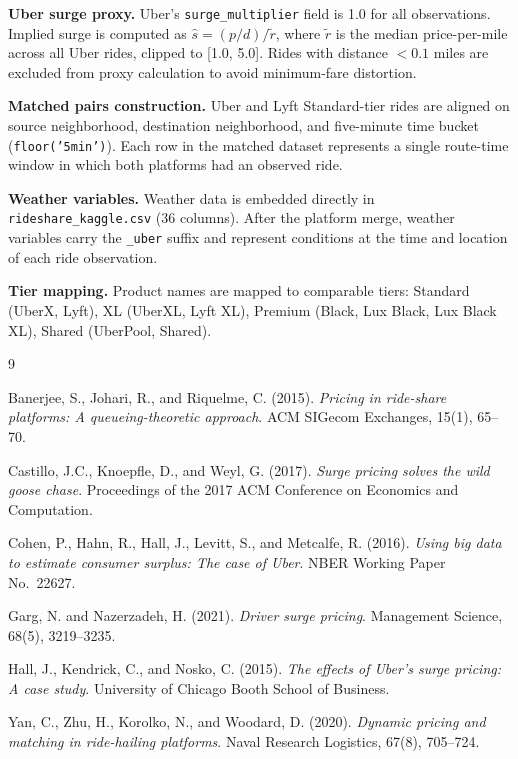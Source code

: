 \documentclass[11pt, letterpaper]{article}
\begin{document}
\textbf{Uber surge proxy.} Uber's \texttt{surge\_multiplier} field is
1.0 for all observations. Implied surge is computed as
$\hat{s} = (p/d) / \tilde{r}$, where $\tilde{r}$ is the median
price-per-mile across all Uber rides, clipped to [1.0, 5.0].
Rides with distance $< 0.1$ miles are excluded from proxy calculation
to avoid minimum-fare distortion.

\textbf{Matched pairs construction.} Uber and Lyft Standard-tier rides
are aligned on source neighborhood, destination neighborhood, and
five-minute time bucket (\texttt{floor('5min')}). Each row in the
matched dataset represents a single route-time window in which both
platforms had an observed ride.

\textbf{Weather variables.} Weather data is embedded directly in
\texttt{rideshare\_kaggle.csv} (36 columns). After the platform merge,
weather variables carry the \texttt{\_uber} suffix and represent
conditions at the time and location of each ride observation.

\textbf{Tier mapping.} Product names are mapped to comparable tiers:
Standard (UberX, Lyft), XL (UberXL, Lyft XL), Premium (Black, Lux Black,
Lux Black XL), Shared (UberPool, Shared).

\newpage

\begin{thebibliography}{9}

Banerjee, S., Johari, R., and Riquelme, C. (2015).
\textit{Pricing in ride-share platforms: A queueing-theoretic approach}.
ACM SIGecom Exchanges, 15(1), 65--70.

Castillo, J.C., Knoepfle, D., and Weyl, G. (2017).
\textit{Surge pricing solves the wild goose chase}.
Proceedings of the 2017 ACM Conference on Economics and Computation.

Cohen, P., Hahn, R., Hall, J., Levitt, S., and Metcalfe, R. (2016).
\textit{Using big data to estimate consumer surplus: The case of Uber}.
NBER Working Paper No.\ 22627.

Garg, N. and Nazerzadeh, H. (2021).
\textit{Driver surge pricing}.
Management Science, 68(5), 3219--3235.

Hall, J., Kendrick, C., and Nosko, C. (2015).
\textit{The effects of Uber's surge pricing: A case study}.
University of Chicago Booth School of Business.

Yan, C., Zhu, H., Korolko, N., and Woodard, D. (2020).
\textit{Dynamic pricing and matching in ride-hailing platforms}.
Naval Research Logistics, 67(8), 705--724.

\end{thebibliography}
\end{document}
